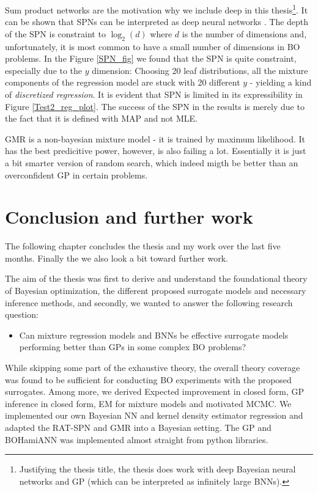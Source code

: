 Sum product networks are the motivation why we include deep in this thesis\footnote{Justifying the
thesis title, the thesis does work with deep Bayesian neural networks and GP (which can be
interpreted as infinitely large BNNs).}. It can be shown that SPNs can be interpreted as deep
neural networks \cite{SPNasNN}. The depth of the SPN is constraint to $\log_2 (d)$ where $d$ is the
number of dimensions and, unfortunately, it is most common to have a small number of dimensions in
BO problems. In the Figure \ref{SPN_fig} we found that the SPN is quite constraint, especially due
to the $y$ dimension: Choosing 20 leaf distributions, all the mixture components of the regression
model are stuck with 20 different $y$ - yielding a kind of \textit{discretized regression}. It is
evident that SPN is limited in its expressibility in Figure \ref{Test2_reg_plot}. The success of the
SPN in the results is merely due to the fact that it is defined with MAP and not MLE. 

GMR is a non-bayesian mixture model - it is trained by maximum likelihood. It has
the best predicitive power, however, is also failing a lot. Essentially it is just a bit smarter
version of random search, which indeed migth be better than an overconfident GP in certain problems.

\chapter{Conclusion and further work}
The following chapter concludes the thesis and my work over the last five months. Finally the 
we also look a bit toward further work. 

The aim of the thesis was first to derive and understand the foundational theory of Bayesian
optimization, the different proposed surrogate models and necessary inference methods, and secondly,
we wanted to answer the following research question: 
\begin{itemize}
    \item Can mixture regression models and BNNs be effective surrogate models
    performing better than GPs in some complex BO problems? 
\end{itemize}

While skipping some part of the exhaustive theory, the overall theory coverage was found to be
sufficient for conducting BO experiments with the proposed surrogates. Among more, we derived
Expected improvement in closed form, GP inference in closed form, EM for mixture models and
motivated MCMC. We implemented our own Bayesian NN and kernel density estimator regression 
and adapted the RAT-SPN and GMR into a Bayesian setting. The GP and BOHamiANN was implemented
almost straight from python libraries. 

